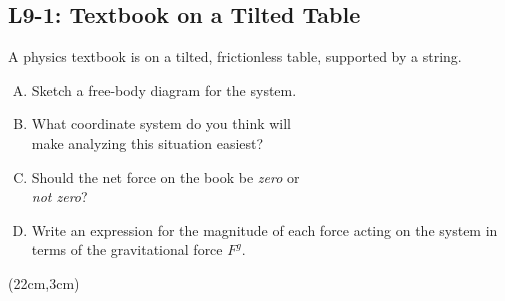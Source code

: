 \documentclass[]{article}
\begin{document}
\begin{PresentSpace}
\vspace{-10pt}
\section*{L9-1: Textbook on a Tilted Table}
\vspace{-10pt}
A physics textbook is on a tilted, frictionless table, supported by a string.
\begin{enumerate}[(A)]
	\item Sketch a free-body diagram for the system.
	\item What coordinate system do you think will \\
	make analyzing this situation easiest?
	\item Should the net force on the book be \textit{zero} or \\
	\textit{not zero}?
	\item Write an expression for the magnitude of each force acting on the system in terms of the gravitational force $F^{g}$.
\end{enumerate}
\end{PresentSpace}
\begin{textblock*}{5cm}(22cm,3cm)
\centering
{}
\end{textblock*}
\newpage
\begin{TeacherMargin}

\end{TeacherMargin}
\end{document}
